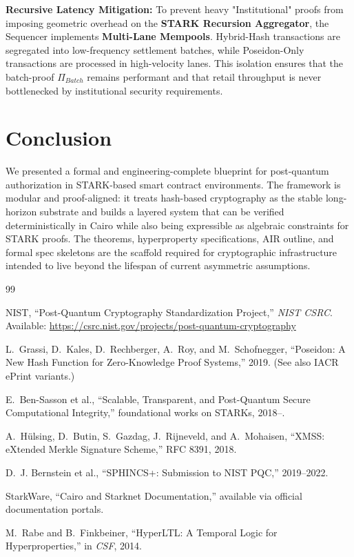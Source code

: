 \documentclass[conference]{IEEEtran}
\theoremstyle{definition}
\theoremstyle{plain}
\theoremstyle{remark}
\begin{document}
\textbf{Recursive Latency Mitigation:} To prevent heavy "Institutional" proofs from imposing geometric overhead on the \textbf{STARK Recursion Aggregator}, the Sequencer implements \textbf{Multi-Lane Mempools}. Hybrid-Hash transactions are segregated into low-frequency settlement batches, while Poseidon-Only transactions are processed in high-velocity lanes. This isolation ensures that the batch-proof $\Pi_{Batch}$ remains performant and that retail throughput is never bottlenecked by institutional security requirements.

\section{Conclusion}
We presented a formal and engineering-complete blueprint for post-quantum authorization in STARK-based smart contract environments. The framework is modular and proof-aligned: it treats hash-based cryptography as the stable long-horizon substrate and builds a layered system that can be verified deterministically in Cairo while also being expressible as algebraic constraints for STARK proofs. The theorems, hyperproperty specifications, AIR outline, and formal spec skeletons are the scaffold required for cryptographic infrastructure intended to live beyond the lifespan of current asymmetric assumptions.

\begin{thebibliography}{99}

NIST, ``Post-Quantum Cryptography Standardization Project,'' \emph{NIST CSRC}. Available: \url{https://csrc.nist.gov/projects/post-quantum-cryptography}

L.~Grassi, D.~Kales, D.~Rechberger, A.~Roy, and M.~Schofnegger, ``Poseidon: A New Hash Function for Zero-Knowledge Proof Systems,'' 2019. (See also IACR ePrint variants.)

E.~Ben-Sasson et al., ``Scalable, Transparent, and Post-Quantum Secure Computational Integrity,'' foundational works on STARKs, 2018--.

A.~H\"ulsing, D.~Butin, S.~Gazdag, J.~Rijneveld, and A.~Mohaisen, ``XMSS: eXtended Merkle Signature Scheme,'' RFC 8391, 2018.

D.~J. Bernstein et al., ``SPHINCS+: Submission to NIST PQC,'' 2019--2022.

StarkWare, ``Cairo and Starknet Documentation,'' available via official documentation portals.

M.~Rabe and B.~Finkbeiner, ``HyperLTL: A Temporal Logic for Hyperproperties,'' in \emph{CSF}, 2014.

\end{thebibliography}
\end{document}

